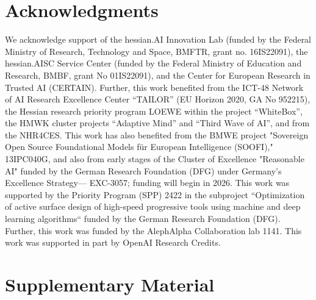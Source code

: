 \documentclass{article}
\begin{document}
\section*{Acknowledgments} We acknowledge support of the hessian.AI Innovation Lab (funded by the Federal Ministry of Research, Technology and Space, BMFTR, grant no. 16IS22091), the hessian.AISC Service Center (funded by the Federal Ministry of Education and Research, BMBF,  grant No 01IS22091), and the Center for European Research in Trusted AI (CERTAIN). Further, this work benefited from the ICT-48 Network of AI Research Excellence Center ``TAILOR'' (EU Horizon 2020, GA No 952215), the Hessian research priority program LOEWE within the project “WhiteBox”, the HMWK cluster projects ``Adaptive Mind'' and ``Third Wave of AI'', and from the NHR4CES. This work has also benefited from the BMWE project "Sovereign Open Source Foundational Models für European Intelligence (SOOFI)," 13IPC040G, and also from early stages of the Cluster of Excellence "Reasonable AI" funded by the German Research Foundation (DFG) under Germany’s Excellence Strategy— EXC-3057; funding will begin in 2026. This work was supported by the Priority Program (SPP) 2422 in the subproject “Optimization of active surface design of high-speed progressive tools using machine and deep learning algorithms“ funded by the German Research Foundation (DFG). Further, this work was funded by the AlephAlpha Collaboration lab 1141. This work was supported in part by OpenAI Research Credits.





\appendix
\section*{Supplementary Material}



\end{document}
